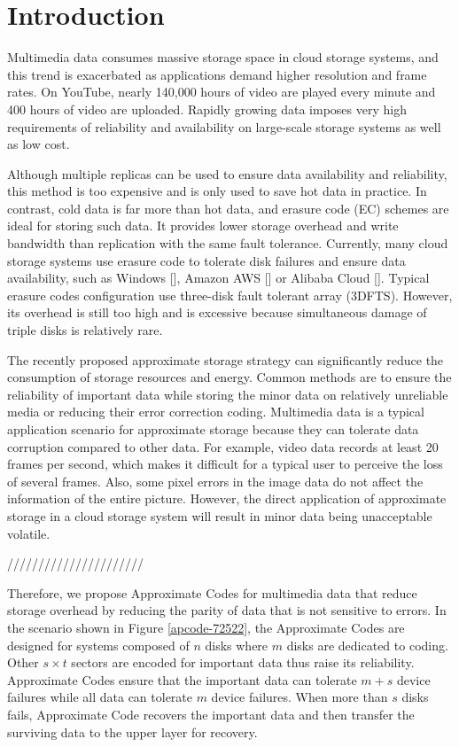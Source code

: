 \documentclass[sigconf]{acmart}
\begin{document}
\maketitle

\section{Introduction}
Multimedia data consumes massive storage space in cloud storage systems, and this trend is exacerbated as applications demand higher resolution and frame rates. On YouTube, nearly 140,000 hours of video are played every minute and 400 hours of video are uploaded. Rapidly growing data imposes very high requirements of reliability and availability on large-scale storage systems as well as low cost.

Although multiple replicas can be used to ensure data availability and reliability, this method is too expensive and is only used to save hot data in practice. In contrast, cold data is far more than hot data, and erasure code (EC) schemes are ideal for storing such data. It provides lower storage overhead and write bandwidth than replication with the same fault tolerance. Currently, many cloud storage systems use erasure code to tolerate disk failures and ensure data availability, such as Windows [], Amazon AWS [] or Alibaba Cloud []. Typical erasure codes configuration use three-disk fault tolerant array (3DFTS). However, its overhead is still too high and is excessive because simultaneous damage of triple disks is relatively rare. 

The recently proposed approximate storage strategy can significantly reduce the consumption of storage resources and energy. Common methods are to ensure the reliability of important data while storing the minor data on relatively unreliable media or reducing their error correction coding. Multimedia data is a typical application scenario for approximate storage because they can tolerate data corruption compared to other data. For example, video data records at least 20 frames per second, which makes it difficult for a typical user to perceive the loss of several frames. Also, some pixel errors in the image data do not affect the information of the entire picture. However, the direct application of approximate storage in a cloud storage system will result in minor data being unacceptable volatile.

//////////////////////

Therefore, we propose Approximate Codes for multimedia data that reduce storage overhead by reducing the parity of data that is not sensitive to errors. In the scenario shown in Figure \ref{apcode-72522}, the Approximate Codes are designed for systems composed of $n$ disks where $m$ disks are dedicated to coding.
Other $s \times t$ sectors are encoded for important data thus raise its reliability. Approximate Codes ensure that the important data can tolerate $m+s$ device failures while all data can tolerate $m$ device failures.
When more than $s$ disks fails, Approximate Code recovers the important data and then transfer the surviving data to the upper layer for recovery. 
\end{document}
